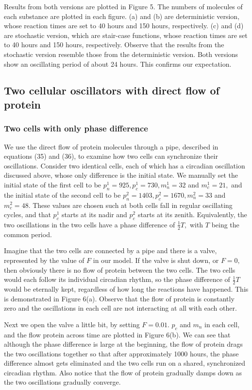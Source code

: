 \documentclass[12pt]{article}
\renewcommand{\(}{\left (}
\renewcommand{\)}{\right )}
\begin{document}
Results from both versions are plotted in Figure 5. The numbers of molecules of each substance are plotted in each figure. (a) and (b) are deterministic version, whose reaction times are set to 40 hours and 150 hours, respectively. (c) and (d) are stochastic version, which are stair-case functions, whose reaction times are set to 40 hours and 150 hours, respectively. Observe that the results from the stochastic version resemble those from the deterministic version. Both versions show an oscillating period of about 24 hours. This confirms our expectation.


\subsection{Two cellular oscillators with direct flow of protein}
\subsubsection{Two cells with only phase difference}
\hspace{5mm} We use the direct flow of protein molecules through a pipe, described in equations (35) and (36), to examine how two cells can synchronize their oscillations. Consider two identical cells, each of which has a circadian oscillation discussed above, whose only difference is the initial state. We manually set the initial state of the first cell to be $p^1_n = 925, p^1_c = 730, m^1_n = 32$ and $m^1_c = 21,$ and the initial state of the second cell to be $p^2_n = 1403, p^2_c = 1670, m^2_n = 33$ and $m^2_c = 48.$ These values are chosen such at both cells fall in regular oscillating cycles, and that $p^1_c$ starts at its nadir and $p^2_c$ starts at its zenith. Equivalently, the two oscillations in the two cells have a phase difference of $\frac{1}{2}T,$ with $T$ being the common period.

Imagine that the two cells are connected by a pipe and there is a valve, represented by the value of $F$ in our model. If the valve is shut down, or $F=0,$ then obviously there is no flow of protein between the two cells. The two cells would each follow its individual circadian rhythm, so the phase difference of $\frac{1}{2}T$ would be eternally kept, regardless of how long the reactions have happened. This is demonstrated in Figure 6(a). Observe that the flow of protein is constantly zero and the oscillations in each cell are not interacting at all with each other.


Next we open the valve a little bit, by setting $F = 0.01.$ $p_c$ and $m_n$ in each cell, and the flow protein across time are plotted in Figure 6(b). We can see that although the phase difference is large at the beginning, the flow of protein drags the two oscillations together so that after approximately 1000 hours, the phase difference almost gets eliminated and the two cells run on a shared, synchronized circadian rhythm. Also notice that the flow of protein gradually damps down as the two oscillations gradually converge.
\end{document}

